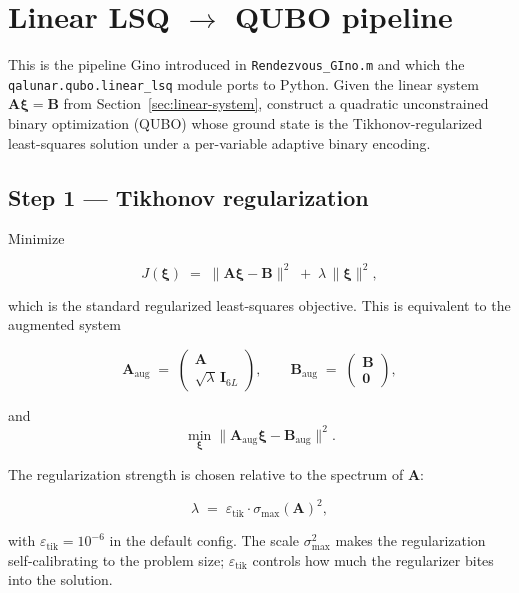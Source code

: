 \documentclass[8pt,a4paper]{article}
\newcommand{\bvec}[1]{\bm{#1}}
\newcommand{\Amat}{\bvec{A}}
\newcommand{\Bmat}{\bvec{B}}
\theoremstyle{definition}
\theoremstyle{remark}
\begin{document}
\section{Linear LSQ $\to$ QUBO pipeline}

This is the pipeline Gino introduced in \texttt{Rendezvous\_GIno.m}
and which the \texttt{qalunar.qubo.linear\_lsq} module ports to
Python. Given the linear system $\Amat \bm\xi = \Bmat$ from
Section~\ref{sec:linear-system}, construct a quadratic unconstrained
binary optimization (QUBO) whose ground state is the
Tikhonov-regularized least-squares solution under a per-variable
adaptive binary encoding.

\subsection{Step 1 --- Tikhonov regularization}

Minimize

\begin{equation}
  J(\bm\xi) \;=\; \|\Amat\bm\xi - \Bmat\|^2 \;+\; \lambda\,\|\bm\xi\|^2,
\label{eq:tikhonov}
\end{equation}

which is the standard regularized least-squares objective. This is
equivalent to the augmented system

\begin{equation}
  \Amat_{\mathrm{aug}} \;=\; \begin{pmatrix} \Amat \\ \sqrt\lambda \, \bvec{I}_{6L} \end{pmatrix},
  \qquad
  \Bmat_{\mathrm{aug}} \;=\; \begin{pmatrix} \Bmat \\ \bm 0 \end{pmatrix},
\end{equation}

and
\begin{equation}
  \min_{\bm\xi} \|\Amat_{\mathrm{aug}}\bm\xi - \Bmat_{\mathrm{aug}}\|^2.
\end{equation}

The regularization strength is chosen relative to the spectrum of
$\Amat$:

\begin{equation}
  \lambda \;=\; \varepsilon_{\mathrm{tik}} \cdot \sigma_{\max}(\Amat)^2,
\end{equation}

with $\varepsilon_{\mathrm{tik}} = 10^{-6}$ in the default config. The
scale $\sigma_{\max}^2$ makes the regularization self-calibrating to
the problem size; $\varepsilon_{\mathrm{tik}}$ controls how much the
regularizer bites into the solution.
\end{document}
